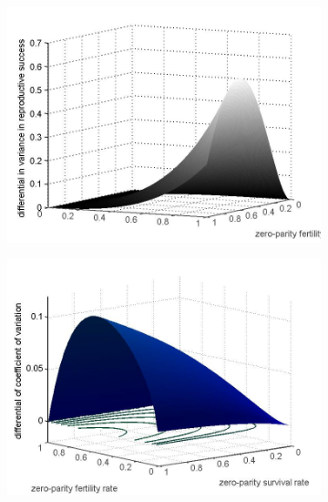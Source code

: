 \documentclass[10pt,a4paper]{article}
\begin{document}
\begin{figure}[htbp]%
\centering

\begin{subfigure}{.5\textwidth}
\centering
\includegraphics[scale=.22]{diffVarCoR.jpg}
\caption{}
\label{fig:diffvar}
\end{subfigure}%
\begin{subfigure}{.5\textwidth}
\centering
\includegraphics[scale=.22]{coeffvariationdiff.jpg}
\caption{}
\label{fig:diffcoefvar}
\end{subfigure}
\\
\begin{subfigure}{.5\textwidth}
\centering

\end{subfigure}
\end{figure}
\end{document}
